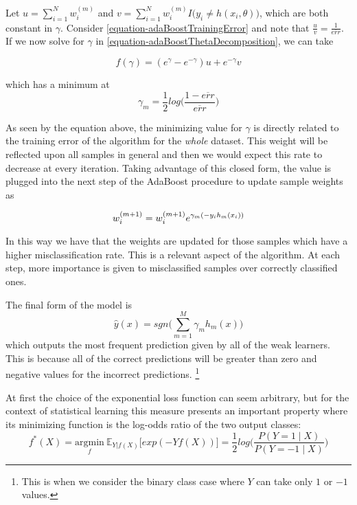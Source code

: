 \documentclass{article}%
\newcommand{\Expect}{{\mathbb{E}}}
\theoremstyle{definition}
\begin{document}
Let $u = \sum_{i=1}^{N}  w_i^{(m)}$ and $v = \sum_{i=1}^{N}  w_i^{(m)} I \big( y_i \neq h(x_i,\theta)   \big) $, which are both constant in $\gamma$. Consider \ref{equation-adaBoostTrainingError} and note that $\frac{u}{v} = \frac{1}{\overline{err}}$. If we now solve for $\gamma$ in \ref{equation-adaBoostThetaDecomposition}, we can take

\begin{equation} \label{equation-adaBoostBetaMinimization}
f(\gamma) = ( e^{\gamma} - e^{-\gamma}) u +  e^{-\gamma}v
\end{equation}

which has a minimum at 
\begin{equation}
\gamma_{m} = \frac{1}{2} log\big( \frac{1 - \overline{err} }{ \overline{err} }  \big)
\end{equation}

As seen by the equation above, the minimizing value for $\gamma$ is directly related to the training error of the algorithm for the \textit{whole} dataset. This weight will be reflected upon all samples in general and then we would expect this rate to decrease at every iteration.  Taking advantage of this closed form, the value is plugged into the next step of the AdaBoost procedure to update sample weights as

\begin{equation}
w_i^{(m+1)} =   w_i^{(m+1)} e^{\gamma_m(-y_i h_m(x_i))} \\
\end{equation} 

In this way we have that the weights are updated for those samples which have a higher misclassification rate. This is a relevant aspect of the algorithm. At each step, more importance is given to misclassified samples over correctly classified ones. 



The final form of the model is
$$  \hat{y}(x) = sgn\big(  \sum_{m=1}^{M} \gamma_m h_m(x) \big)$$ which outputs the most frequent prediction given by all of the weak learners. This is because all of the correct predictions will be greater than zero and negative values for the incorrect predictions. \footnote{This is when we consider the binary class case where $Y$ can take only $1$ or $-1$ values.}

At first the choice of the exponential loss function can seem arbitrary, but for the context of statistical learning this measure presents an important property where its minimizing function is the log-odds ratio of the two output classes:
$$f^*(X) = \underset{f}{\mathrm{argmin}} \  \Expect_{Y | f(X)}\big[ exp(-Yf(X))  \big] = \frac{1}{2}
log\big( \frac{ P(Y=1 \mid X) }{ P(Y=-1 \mid X) }  \big) $$
\end{document}
